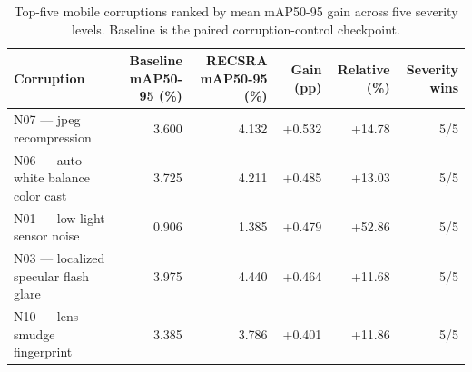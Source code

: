 \begin{table}[t]
\centering
\caption{Top-five mobile corruptions ranked by mean mAP50-95 gain across five severity levels. Baseline is the paired corruption-control checkpoint.}
\label{tab:top5-corruptions}
\begin{tabular}{lrrrrr}
\hline
Corruption & Baseline mAP50-95 (\%) & RECSRA mAP50-95 (\%) & Gain (pp) & Relative (\%) & Severity wins \\
\hline
N07 — jpeg recompression & 3.600 & 4.132 & +0.532 & +14.78 & 5/5 \\
N06 — auto white balance color cast & 3.725 & 4.211 & +0.485 & +13.03 & 5/5 \\
N01 — low light sensor noise & 0.906 & 1.385 & +0.479 & +52.86 & 5/5 \\
N03 — localized specular flash glare & 3.975 & 4.440 & +0.464 & +11.68 & 5/5 \\
N10 — lens smudge fingerprint & 3.385 & 3.786 & +0.401 & +11.86 & 5/5 \\
\hline
\end{tabular}
\end{table}
